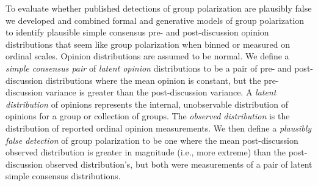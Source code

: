 \documentclass[
  abstract]{article}
\begin{document}
To evaluate whether published detections of group polarization are
plausibly false we developed and combined formal and generative models
of group polarization to identify plausible simple consensus pre- and
post-discussion opinion distributions that seem like group polarization
when binned or measured on ordinal scales. Opinion distributions are
assumed to be normal. We define a \emph{simple consensus pair} of
\emph{latent opinion} distributions to be a pair of pre- and
post-discussion distributions where the mean opinion is constant, but
the pre-discussion variance is greater than the post-discussion
variance. A \emph{latent distribution} of opinions represents the
internal, unobservable distribution of opinions for a group or
collection of groups. The \emph{observed distribution} is the
distribution of reported ordinal opinion measurements. We then define a
\emph{plausibly false detection} of group polarization to be one where
the mean post-discussion observed distribution is greater in magnitude
(i.e., more extreme) than the post-discussion observed distribution's,
but both were measurements of a pair of latent simple consensus
distributions.
\end{document}
